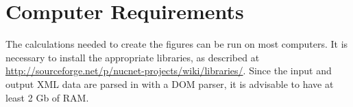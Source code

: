 \section*{Computer Requirements}

\hspace{12ex}The calculations needed to create the figures can be run on most 
computers.  It is necessary to install the appropriate libraries, as described 
at \url{http://sourceforge.net/p/nucnet-projects/wiki/libraries/}.
Since the input and 
output XML data are parsed in with a DOM parser, it is advisable to have at 
least 2 Gb of RAM.

